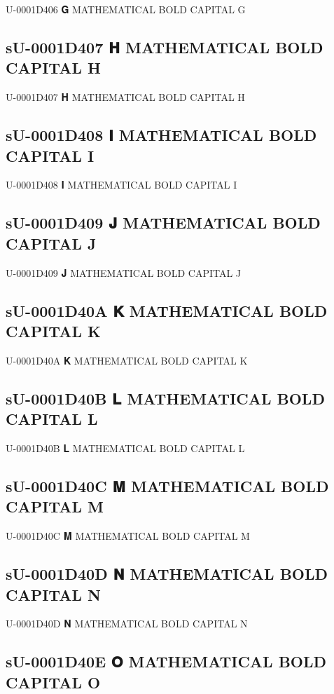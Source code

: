 U-0001D406 𝐆 MATHEMATICAL BOLD CAPITAL G

\subsection{sU-0001D407 𝐇 MATHEMATICAL BOLD CAPITAL H}

U-0001D407 𝐇 MATHEMATICAL BOLD CAPITAL H

\subsection{sU-0001D408 𝐈 MATHEMATICAL BOLD CAPITAL I}

U-0001D408 𝐈 MATHEMATICAL BOLD CAPITAL I

\subsection{sU-0001D409 𝐉 MATHEMATICAL BOLD CAPITAL J}

U-0001D409 𝐉 MATHEMATICAL BOLD CAPITAL J

\subsection{sU-0001D40A 𝐊 MATHEMATICAL BOLD CAPITAL K}

U-0001D40A 𝐊 MATHEMATICAL BOLD CAPITAL K

\subsection{sU-0001D40B 𝐋 MATHEMATICAL BOLD CAPITAL L}

U-0001D40B 𝐋 MATHEMATICAL BOLD CAPITAL L

\subsection{sU-0001D40C 𝐌 MATHEMATICAL BOLD CAPITAL M}

U-0001D40C 𝐌 MATHEMATICAL BOLD CAPITAL M

\subsection{sU-0001D40D 𝐍 MATHEMATICAL BOLD CAPITAL N}

U-0001D40D 𝐍 MATHEMATICAL BOLD CAPITAL N

\subsection{sU-0001D40E 𝐎 MATHEMATICAL BOLD CAPITAL O}

